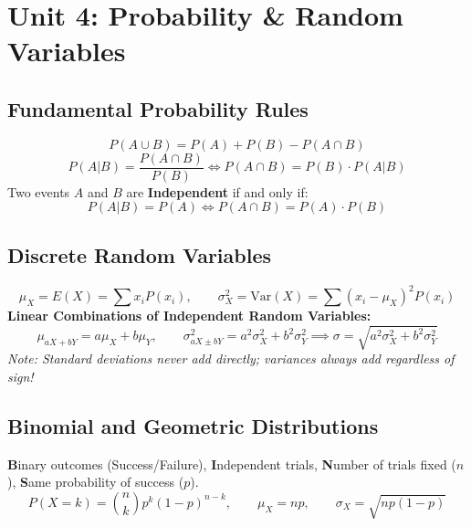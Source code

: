 ﻿\documentclass[11pt,oneside,openany]{book}
\begin{document}
\chapter{Unit 4: Probability \& Random Variables}

\section{Fundamental Probability Rules}
\begin{equation}
  P(A \cup B) = P(A) + P(B) - P(A \cap B)
\end{equation}
\begin{equation}
  P(A|B) = \frac{P(A \cap B)}{P(B)} \iff P(A \cap B) = P(B) \cdot P(A|B)
\end{equation}
Two events $A$ and $B$ are \textbf{Independent} if and only if:
\begin{equation}
  P(A|B) = P(A) \iff P(A \cap B) = P(A) \cdot P(B)
\end{equation}

\section{Discrete Random Variables}
\begin{equation}
  \mu_X = E(X) = \sum x_i P(x_i), \qquad \sigma_X^2 = \text{Var}(X) = \sum (x_i - \mu_X)^2 P(x_i)
\end{equation}
\textbf{Linear Combinations of Independent Random Variables:}
\begin{equation}
  \mu_{aX + bY} = a\mu_X + b\mu_Y, \qquad \sigma_{aX \pm bY}^2 = a^2\sigma_X^2 + b^2\sigma_Y^2 \implies \sigma = \sqrt{a^2\sigma_X^2 + b^2\sigma_Y^2}
\end{equation}
\textit{Note: Standard deviations never add directly; variances always add regardless of sign!}

\section{Binomial and Geometric Distributions}
\begin{lessonbox}
\textbf{B}inary outcomes (Success/Failure), \textbf{I}ndependent trials, \textbf{N}umber of trials fixed ($n$), \textbf{S}ame probability of success ($p$).
\begin{equation}
  P(X = k) = \binom{n}{k} p^k (1-p)^{n-k}, \qquad \mu_X = np, \qquad \sigma_X = \sqrt{np(1-p)}
\end{equation}
\end{lessonbox}
\end{document}
